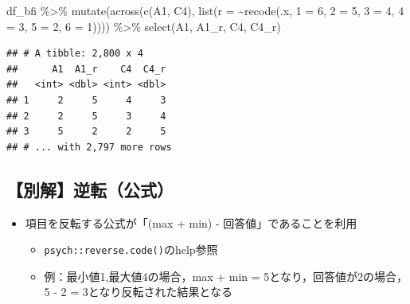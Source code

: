 \documentclass[
  xelatex,ja=standard, b5paper]{bxjsbook}
\newenvironment{Shaded}{\begin{snugshade}}{\end{snugshade}}
\newcommand{\AttributeTok}[1]{\textcolor[rgb]{0.77,0.63,0.00}{#1}}
\newcommand{\DecValTok}[1]{\textcolor[rgb]{0.00,0.00,0.81}{#1}}
\newcommand{\FunctionTok}[1]{\textcolor[rgb]{0.00,0.00,0.00}{#1}}
\newcommand{\NormalTok}[1]{#1}
\newcommand{\OtherTok}[1]{\textcolor[rgb]{0.56,0.35,0.01}{#1}}
\newcommand{\SpecialCharTok}[1]{\textcolor[rgb]{0.00,0.00,0.00}{#1}}
\newcommand{\StringTok}[1]{\textcolor[rgb]{0.31,0.60,0.02}{#1}}
\providecommand{\tightlist}{%
  \setlength{\itemsep}{0pt}\setlength{\parskip}{0pt}}
\begin{document}
\begin{Shaded}
\begin{Highlighting}[]
\NormalTok{df\_bfi }\SpecialCharTok{\%\textgreater{}\%} 
  \FunctionTok{mutate}\NormalTok{(}\FunctionTok{across}\NormalTok{(}\FunctionTok{c}\NormalTok{(A1, C4),}
                \FunctionTok{list}\NormalTok{(}\AttributeTok{r =} \SpecialCharTok{\textasciitilde{}}\FunctionTok{recode}\NormalTok{(.x, }\StringTok{\textasciigrave{}}\AttributeTok{1}\StringTok{\textasciigrave{}} \OtherTok{=} \DecValTok{6}\NormalTok{, }\StringTok{\textasciigrave{}}\AttributeTok{2}\StringTok{\textasciigrave{}} \OtherTok{=} \DecValTok{5}\NormalTok{, }\StringTok{\textasciigrave{}}\AttributeTok{3}\StringTok{\textasciigrave{}} \OtherTok{=} \DecValTok{4}\NormalTok{, }
                                 \StringTok{\textasciigrave{}}\AttributeTok{4}\StringTok{\textasciigrave{}} \OtherTok{=} \DecValTok{3}\NormalTok{, }\StringTok{\textasciigrave{}}\AttributeTok{5}\StringTok{\textasciigrave{}} \OtherTok{=} \DecValTok{2}\NormalTok{, }\StringTok{\textasciigrave{}}\AttributeTok{6}\StringTok{\textasciigrave{}} \OtherTok{=} \DecValTok{1}\NormalTok{)))) }\SpecialCharTok{\%\textgreater{}\%} 
  \FunctionTok{select}\NormalTok{(A1, A1\_r, C4, C4\_r)}
\end{Highlighting}
\end{Shaded}

\begin{verbatim}
## # A tibble: 2,800 x 4
##      A1  A1_r    C4  C4_r
##   <int> <dbl> <int> <dbl>
## 1     2     5     4     3
## 2     2     5     3     4
## 3     5     2     2     5
## # ... with 2,797 more rows
\end{verbatim}

\hypertarget{mu-rev-rule}{%
\subsection{【別解】逆転（公式）}\label{mu-rev-rule}}

\begin{itemize}
\tightlist
\item
  項目を反転する公式が「(max + min) - 回答値」であることを利用

  \begin{itemize}
  \tightlist
  \item
    \texttt{psych::reverse.code()}のhelp参照
  \item
    例：最小値1,最大値4の場合，max + min = 5となり，回答値が2の場合，5 - 2 = 3となり反転された結果となる
  \end{itemize}
\end{itemize}
\end{document}
